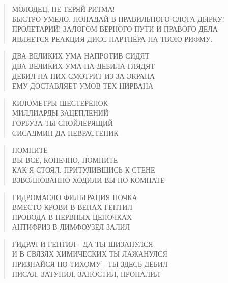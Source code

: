 \poemtitle{***}
\begin{verse}
МОЛОДЕЦ, НЕ ТЕРЯЙ РИТМА!\\
БЫСТРО-УМЕЛО, ПОПАДАЙ В ПРАВИЛЬНОГО СЛОГА ДЫРКУ!\\
ПРОЛЕТАРИЙ! ЗАЛОГОМ ВЕРНОГО ПУТИ И ПРАВОГО ДЕЛА\\
ЯВЛЯЕТСЯ РЕАКЦИЯ ДИСС-ПАРТНЁРА НА ТВОЮ РИФМУ.
\end{verse}

\poemtitle{***}
\begin{verse}
ДВА ВЕЛИКИХ УМА НАПРОТИВ СИДЯТ\\
ДВА ВЕЛИКИХ УМА НА ДЕБИЛА ГЛЯДЯТ\\
ДЕБИЛ НА НИХ СМОТРИТ ИЗ-ЗА ЭКРАНА\\
ЕМУ ДОСТАВЛЯЕТ УМОВ ТЕХ НИРВАНА
\end{verse}

\poemtitle{***}
\begin{verse}
КИЛОМЕТРЫ ШЕСТЕРЁНОК\\
МИЛЛИАРДЫ ЗАЦЕПЛЕНИЙ\\
ГОРБУЗА ТЫ СПОЙЛЕРЯЩИЙ\\
СИСАДМИН ДА НЕВРАСТЕНИК
\end{verse}

\poemtitle{***}
\begin{verse}
ПОМНИТЕ\\
ВЫ ВСЕ, КОНЕЧНО, ПОМНИТЕ\\
КАК Я СТОЯЛ, ПРИТУЛИВШИСЬ К СТЕНЕ\\
ВЗВОЛНОВАННО ХОДИЛИ ВЫ ПО КОМНАТЕ
\end{verse}

\poemtitle{***}
\begin{verse}
ГИДРОМАСЛО ФИЛЬТРАЦИЯ ПОЧКА\\
ВМЕСТО КРОВИ В ВЕНАХ ГЕПТИЛ\\
ПРОВОДА В НЕРВНЫХ ЦЕПОЧКАХ\\
АНТИФРИЗ В ЛИМФОУЗЕЛ ЗАЛИЛ
\end{verse}

\poemtitle{***}
\begin{verse}
ГИДРАЧ И ГЕПТИЛ - ДА ТЫ ШИЗАНУЛСЯ\\
И В СВЯЗЯХ ХИМИЧЕСКИХ ТЫ ЛАЖАНУЛСЯ\\
ПРИЗНАЙСЯ ПО ТИХОМУ - ТЫ ЗДЕСЬ ДЕБИЛ\\
ПИСАЛ, ЗАТУПИЛ, ЗАПОСТИЛ, ПРОПАЛИЛ
\end{verse}


